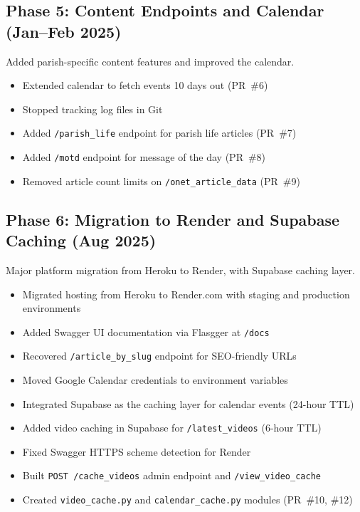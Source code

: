 \documentclass[12pt]{article}
\begin{document}
\subsection{Phase 5: Content Endpoints and Calendar (Jan--Feb 2025)}

Added parish-specific content features and improved the calendar.

\begin{itemize}
    \item Extended calendar to fetch events 10 days out (PR~\#6)
    \item Stopped tracking log files in Git
    \item Added \texttt{/parish\_life} endpoint for parish life articles (PR~\#7)
    \item Added \texttt{/motd} endpoint for message of the day (PR~\#8)
    \item Removed article count limits on \texttt{/onet\_article\_data} (PR~\#9)
\end{itemize}

\subsection{Phase 6: Migration to Render and Supabase Caching (Aug 2025)}

Major platform migration from Heroku to Render, with Supabase caching layer.

\begin{itemize}
    \item Migrated hosting from Heroku to Render.com with staging and production environments
    \item Added Swagger UI documentation via Flasgger at \texttt{/docs}
    \item Recovered \texttt{/article\_by\_slug} endpoint for SEO-friendly URLs
    \item Moved Google Calendar credentials to environment variables
    \item Integrated Supabase as the caching layer for calendar events (24-hour TTL)
    \item Added video caching in Supabase for \texttt{/latest\_videos} (6-hour TTL)
    \item Fixed Swagger HTTPS scheme detection for Render
    \item Built \texttt{POST /cache\_videos} admin endpoint and \texttt{/view\_video\_cache}
    \item Created \texttt{video\_cache.py} and \texttt{calendar\_cache.py} modules (PR~\#10, \#12)
\end{itemize}
\end{document}
